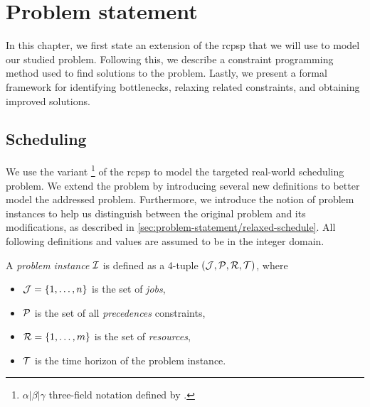 \chapter{Problem statement} \label{chap:problem-statement}

In this chapter, we first state an extension of the \ac{rcpsp} that we will use to model our studied problem.
Following this, we describe a constraint programming method used to find solutions to the problem.
Lastly, we present a formal framework for identifying bottlenecks, relaxing related constraints,
and obtaining improved solutions.

\section{Scheduling} \label{sec:problem-statement/scheduling}

We use the \Problem{} variant%
\footnote{$\alpha | \beta | \gamma$ three-field notation defined by \citet{Brucker1999}.}
of the \ac{rcpsp} to model the targeted real-world scheduling problem.
We extend the problem by introducing several new definitions to better model the addressed problem.
Furthermore, we introduce the notion of problem instances to help us distinguish between the original problem
and its modifications, as described in \cref{sec:problem-statement/relaxed-schedule}.
All following definitions and values are assumed to be in the integer domain.

\begin{defn} \label{def:problem-instance}
A \emph{problem instance} $\mathcal{I}$ is defined as a 4-tuple $(\mathcal{J}, \mathcal{P}, \mathcal{R}, \mathcal{T})$,
where
\begin{itemize}
    \item $\mathcal{J} = \{1, \dots, n\}$ is the set of \emph{jobs},
    \item $\mathcal{P}$ is the set of all \emph{precedences} constraints,
    \item $\mathcal{R} = \{1, \dots, m\}$ is the set of \emph{resources},
    \item $\mathcal{T}$ is the time horizon of the problem instance.
\end{itemize}
\end{defn}

